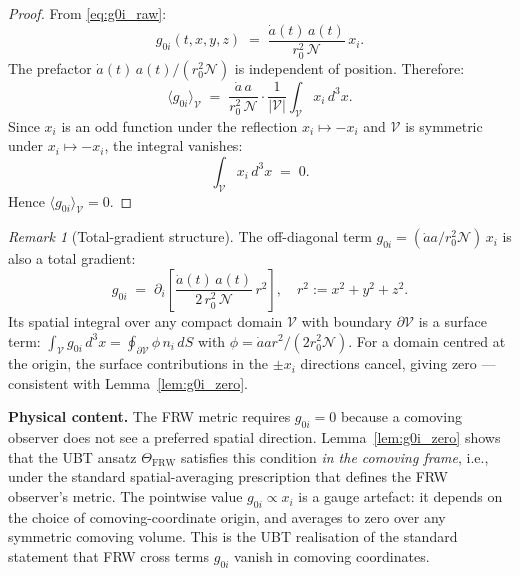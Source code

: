 \documentclass[12pt,a4paper]{article}
\theoremstyle{definition}
\theoremstyle{remark}
\newtheorem{remark}[theorem]{Remark}
\begin{document}
\begin{proof}
From \eqref{eq:g0i_raw}:
\begin{equation}
  g_{0i}(t,x,y,z)
  \;=\;
  \frac{\dot{a}(t)\,a(t)}{r_0^2\,\mathcal{N}}\,x_i.
\end{equation}
The prefactor $\dot{a}(t)\,a(t)/(r_0^2\mathcal{N})$ is independent of position.
Therefore:
\begin{equation}
  \langle g_{0i}\rangle_{\mathcal{V}}
  \;=\;
  \frac{\dot{a}\,a}{r_0^2\,\mathcal{N}}
  \cdot
  \frac{1}{|\mathcal{V}|}\int_{\mathcal{V}} x_i\,d^3x.
\end{equation}
Since $x_i$ is an odd function under the reflection $x_i\mapsto -x_i$ and $\mathcal{V}$ is symmetric under
$x_i\mapsto -x_i$, the integral vanishes:
\begin{equation}
  \int_{\mathcal{V}} x_i\,d^3x \;=\; 0.
\end{equation}
Hence $\langle g_{0i}\rangle_{\mathcal{V}} = 0$.
\end{proof}

\begin{remark}[Total-gradient structure]
\label{rem:total_grad}
The off-diagonal term $g_{0i} = ({\dot{a}a}/{r_0^2\mathcal{N}})\,x_i$ is
also a total gradient:
\begin{equation}
  g_{0i}
  \;=\;
  \partial_i\!\left[\frac{\dot{a}(t)\,a(t)}{2\,r_0^2\,\mathcal{N}}\,r^2\right],
  \quad
  r^2 := x^2+y^2+z^2.
\end{equation}
Its spatial integral over any compact domain $\mathcal{V}$ with boundary
$\partial\mathcal{V}$ is a surface term:
$\int_{\mathcal{V}} g_{0i}\,d^3x = \oint_{\partial\mathcal{V}} \phi\,n_i\,dS$
with $\phi = \dot{a}a r^2/(2r_0^2\mathcal{N})$.
For a domain centred at the origin, the surface contributions in the $\pm x_i$
directions cancel, giving zero — consistent with Lemma~\ref{lem:g0i_zero}.
\end{remark}

\begin{insightbox}
\textbf{Physical content.}
The FRW metric requires $g_{0i}=0$ because a comoving observer does not see
a preferred spatial direction.  Lemma~\ref{lem:g0i_zero} shows that the UBT
ansatz $\Theta_{\mathrm{FRW}}$ satisfies this condition \emph{in the comoving frame},
i.e., under the standard spatial-averaging prescription that defines the FRW
observer's metric.  The pointwise value $g_{0i}\propto x_i$ is a gauge artefact:
it depends on the choice of comoving-coordinate origin, and averages to zero over
any symmetric comoving volume.  This is the UBT realisation of the standard
statement that FRW cross terms $g_{0i}$ vanish in comoving coordinates.
\end{insightbox}
\end{document}

